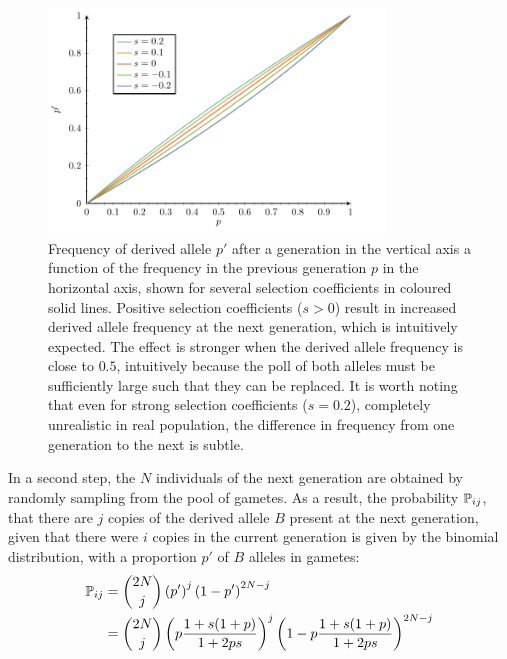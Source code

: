 \begin{figure}[H]
    \centering
    \includegraphics[width=0.8\textwidth, page=1] {figures.pdf}
    \caption[Frequency of derived {allele} after a generation]{
    Frequency of derived \gls{allele} $p'$ after a generation in the vertical axis a function of the frequency in the previous generation $p$ in the horizontal axis, shown for several selection coefficients in coloured solid lines.
    Positive selection coefficients ($s > 0$) result in increased derived \gls{allele} frequency at the next generation, which is intuitively expected.
    The effect is stronger when the derived \gls{allele} frequency is close to $0.5$, intuitively because the poll of both \glspl{allele} must be sufficiently large such that they can be replaced.
    It is worth noting that even for strong selection coefficients ($s=0.2$), completely unrealistic in real population, the difference in frequency from one generation to the next is subtle.}
    \label{fig:frequency-derived-allele}
\end{figure}


In a second step, the $N$ individuals of the next generation are obtained by randomly sampling from the pool of \glspl{gamete}.
As a result, the probability $\mathbb{P}_{ij}$, that there are $j$ copies of the derived \gls{allele} $B$ present at the next generation, given that there were $i$ copies in the current generation is given by the binomial distribution, with a proportion $p'$ of $B$ \glspl{allele} in \glspl{gamete}:
\begin{align}
    \mathbb{P}_{ij} & = \binom{2 N}{j} \left( p' \right)^j \left(1 - p' \right)^{2 N -j} \\
    & = \binom{2 N}{j} \left( p\dfrac{1+s(1+p)}{1 + 2ps} \right)^j \left(1 - p\dfrac{1+s(1+p)}{1 + 2ps} \right)^{2 N -j} \label{eq:binomial-WF}
\end{align}


